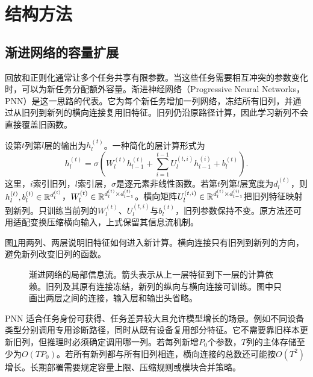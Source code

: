 \section{结构方法}
\subsection{渐进网络的容量扩展}
回放和正则化通常让多个任务共享有限参数。当这些任务需要相互冲突的参数变化时，可以为新任务分配额外容量。渐进神经网络（Progressive Neural Networks，PNN）是这一思路的代表\cite{rusu2016progressive}。它为每个新任务增加一列网络，冻结所有旧列，并通过从旧列到新列的横向连接复用旧特征。旧列仍沿原路径计算，因此学习新列不会直接覆盖旧函数。

设第$t$列第$l$层的输出为$h_l^{(t)}$。一种简化的层计算形式为
\begin{equation}
 h_l^{(t)}=\sigma\!\left(W_l^{(t)}h_{l-1}^{(t)}
 +\sum_{i=1}^{t-1}U_l^{(t,i)}h_{l-1}^{(i)}+b_l^{(t)}\right).
\end{equation}
这里，$i$索引旧列，$l$索引层，$\sigma$是逐元素非线性函数。若第$t$列第$l$层宽度为$d_l^{(t)}$，则$h_l^{(t)},b_l^{(t)}\in\mathbb{R}^{d_l^{(t)}}$，$W_l^{(t)}\in\mathbb{R}^{d_l^{(t)}\times d_{l-1}^{(t)}}$。横向矩阵$U_l^{(t,i)}\in\mathbb{R}^{d_l^{(t)}\times d_{l-1}^{(i)}}$把旧列特征映射到新列。只训练当前列的$W_l^{(t)}$、$U_l^{(t,i)}$与$b_l^{(t)}$，旧列参数保持不变。原方法还可用适配变换压缩横向输入，上式保留其信息流机制。

图\ref{fig:continual-progressive}用两列、两层说明旧特征如何进入新计算。横向连接只有旧列到新列的方向，避免新列改变旧列的函数。
\begin{figure}[htbp]
\centering
{}
\caption{渐进网络的局部信息流。箭头表示从上一层特征到下一层的计算依赖。旧列及其原有连接冻结，新列的纵向与横向连接可训练。图中只画出两层之间的连接，输入层和输出头省略。}
\label{fig:continual-progressive}
\end{figure}

PNN 适合任务身份可获得、任务差异较大且允许模型增长的场景。例如不同设备类型分别调用专用诊断路径，同时从既有设备复用部分特征。它不需要靠旧样本更新旧列，但推理时必须确定调用哪一列。若每列新增$P_0$个参数，$T$列的主体存储至少为$O(TP_0)$。若所有新列都与所有旧列相连，横向连接的总数还可能按$O(T^2)$增长。长期部署需要规定容量上限、压缩规则或模块合并策略。

